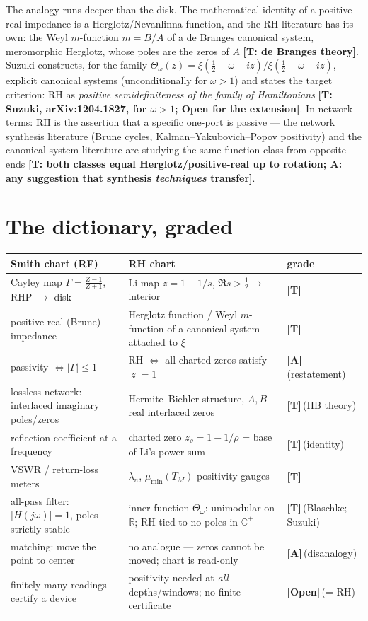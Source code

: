 \documentclass[11pt]{article}
\theoremstyle{remark}
\newcommand{\gr}[1]{\textbf{[#1]}} %
\begin{document}
The analogy runs deeper than the disk. The mathematical identity of a positive-real
impedance is a Herglotz/Nevanlinna function, and the RH literature has its own: the Weyl
$m$-function $m=B/A$ of a de Branges canonical system, meromorphic Herglotz, whose poles are
the zeros of $A$ \gr{T: de Branges theory}. Suzuki constructs, for the family
$\Theta_\omega(z)=\xi(\tfrac12-\omega-iz)/\xi(\tfrac12+\omega-iz)$, explicit canonical
systems (unconditionally for $\omega>1$) and states the target criterion: RH as
\emph{positive semidefiniteness of the family of Hamiltonians} \gr{T: Suzuki,
arXiv:1204.1827, for $\omega>1$; Open for the extension}. In network terms: RH is the
assertion that a specific one-port is passive --- the network synthesis literature
(Brune cycles, Kalman--Yakubovich--Popov positivity) and the canonical-system literature are
studying the same function class from opposite ends \gr{T: both classes equal
Herglotz/positive-real up to rotation; A: any suggestion that synthesis \emph{techniques}
transfer}.

\section{The dictionary, graded}

\begin{center}
\small
\begin{tabular}{p{4.6cm}p{5.6cm}l}
\toprule
Smith chart (RF) & RH chart & grade \\
\midrule
Cayley map $\Gamma=\frac{Z-1}{Z+1}$, RHP $\to$ disk & Li map $z=1-1/s$, $\Re s>\tfrac12\to$ interior & \gr{T} \\[2pt]
positive-real (Brune) impedance & Herglotz function / Weyl $m$-function of a canonical system attached to $\xi$ & \gr{T} \\[2pt]
passivity $\Leftrightarrow|\Gamma|\le1$ & RH $\Leftrightarrow$ all charted zeros satisfy $|z|=1$ & \gr{A}\,(restatement) \\[2pt]
lossless network: interlaced imaginary poles/zeros & Hermite--Biehler structure, $A,B$ real interlaced zeros & \gr{T}\,(HB theory) \\[2pt]
reflection coefficient at a frequency & charted zero $z_\rho=1-1/\rho$ = base of Li's power sum & \gr{T}\,(identity) \\[2pt]
VSWR / return-loss meters & $\lambda_n$, $\mu_{\min}(T_M)$ positivity gauges & \gr{T} \\[2pt]
all-pass filter: $|H(j\omega)|=1$, poles strictly stable & inner function $\Theta_\omega$: unimodular on $\mathbb R$; RH tied to no poles in $\mathbb C^+$ & \gr{T}\,(Blaschke; Suzuki) \\[2pt]
matching: move the point to center & no analogue --- zeros cannot be moved; chart is read-only & \gr{A}\,(disanalogy) \\[2pt]
finitely many readings certify a device & positivity needed at \emph{all} depths/windows; no finite certificate & \gr{Open}\,(= RH) \\
\bottomrule
\end{tabular}
\end{center}
\end{document}
